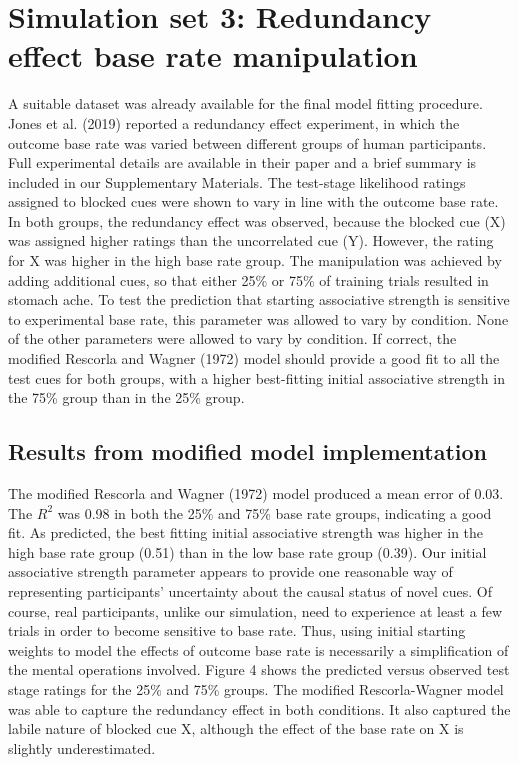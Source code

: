 \documentclass[twocolumn]{article}
\begin{document}
\section{Simulation set 3: Redundancy effect base rate manipulation}

A suitable dataset was already available for the final model fitting
procedure. Jones et al. (2019) reported a redundancy effect experiment,
in which the outcome base rate was varied between different groups of
human participants. Full experimental details are available in their
paper and a brief summary is included in our Supplementary Materials.
The test-stage likelihood ratings assigned to blocked cues were shown to
vary in line with the outcome base rate. In both groups, the redundancy
effect was observed, because the blocked cue (X) was assigned higher
ratings than the uncorrelated cue (Y). However, the rating for X was
higher in the high base rate group. The manipulation was achieved by
adding additional cues, so that either 25\% or 75\% of training trials
resulted in stomach ache. To test the prediction that starting
associative strength is sensitive to experimental base rate, this
parameter was allowed to vary by condition. None of the other parameters
were allowed to vary by condition. If correct, the modified Rescorla and
Wagner (1972) model should provide a good fit to all the test cues for
both groups, with a higher best-fitting initial associative strength in
the 75\% group than in the 25\% group.

\subsection{Results from modified model implementation}

The modified Rescorla and Wagner (1972) model produced a mean error of
0.03. The $R^2$ was 0.98 in both the 25\% and 75\% base
rate groups, indicating a good fit. As predicted, the best fitting
initial associative strength was higher in the high base rate group
(0.51) than in the low base rate group (0.39). Our initial associative
strength parameter appears to provide one reasonable way of representing
participants' uncertainty about the causal status of novel cues. Of
course, real participants, unlike our simulation, need to experience at
least a few trials in order to become sensitive to base rate. Thus,
using initial starting weights to model the effects of outcome base rate
is necessarily a simplification of the mental operations involved.
Figure 4 shows the predicted versus observed test stage ratings for the
25\% and 75\% groups. The modified Rescorla-Wagner model was able to
capture the redundancy effect in both conditions. It also captured the
labile nature of blocked cue X, although the effect of the base rate on
X is slightly underestimated.
\end{document}
